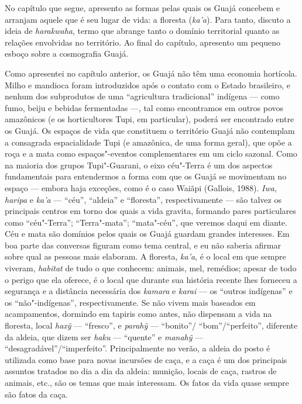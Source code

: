 No capítulo que segue, apresento as formas pelas quais os Guajá concebem
e arranjam aquele que é seu lugar de vida: a floresta (\emph{ka'a}).
Para tanto, discuto a ideia de \emph{harakwaha}, termo que abrange tanto
o domínio territorial quanto as relações envolvidas no território. Ao
final do capítulo, apresento um pequeno esboço sobre a cosmografia
Guajá.

Como apresentei no capítulo anterior, os Guajá não têm uma economia
hortícola. Milho e mandioca foram introduzidos após o contato com o
Estado brasileiro, e nenhum dos subprodutos de uma ``agricultura
tradicional'' indígena --- como fumo, beiju e bebidas fermentadas ---, tal
como encontramos em outros povos amazônicos (e os horticultores Tupi, em
particular), poderá ser encontrado entre os Guajá. Os espaços de vida
que constituem o território Guajá não contemplam a consagrada
espacialidade Tupi (e amazônica, de uma forma geral), que opõe a roça e
a mata como espaços"-eventos complementares em um ciclo sazonal. Como na
maioria dos grupos Tupi"-Guarani, o eixo céu"-Terra é um dos aspectos
fundamentais para entendermos a forma com que os Guajá se movimentam no
espaço --- embora haja exceções, como é o caso Waiãpi (Gallois, 1988).
\emph{Iwa}, \emph{haripa} e \emph{ka'a} --- ``céu'', ``aldeia'' e ``floresta'',
respectivamente --- são talvez os principais centros em torno dos quais a
vida gravita, formando pares particulares como ``céu"-Terra'';
``Terra"-mata''; ``mata"-céu'', que veremos daqui em diante. Céu e mata são
domínios pelos quais os Guajá guardam grandes interesses. Em boa parte
das conversas figuram como tema central, e eu não saberia afirmar sobre
qual as pessoas mais elaboram. A floresta, \emph{ka'a}, é o local em que
sempre viveram, \emph{habitat} de tudo o que conhecem: animais, mel,
remédios; apesar de todo o perigo que ela oferece, é o local que durante
sua história recente lhes forneceu a segurança e a distância necessária
dos \emph{kamara} e \emph{karai} --- os ``outros indígenas'' e os
``não"-indígenas'', respectivamente. Se não vivem mais baseados em
acampamentos, dormindo em tapiris como antes, não dispensam a vida na
floresta, local \emph{haxỹ} --- ``fresco'', e \emph{parahỹ} --- ``bonito''/
``bom''/``perfeito'', diferente da aldeia, que dizem ser \emph{haku} ---
``quente'' e \emph{manahỹ} --- ``desagradável''/``imperfeito''. Principalmente
no verão, a aldeia do posto é utilizada como base para novas incursões
de caça, e a caça é um dos principais assuntos tratados no dia a dia da
aldeia: munição, locais de caça, rastros de animais, etc., são os temas
que mais interessam. Os fatos da vida quase sempre são fatos da caça.

